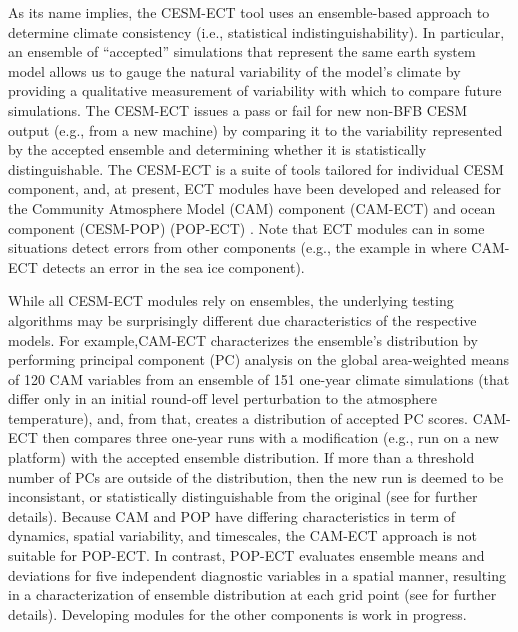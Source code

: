 As its name implies, the CESM-ECT tool uses an ensemble-based approach
to determine climate consistency (i.e., statistical
indistinguishability).  In particular, an ensemble of ``accepted''
simulations that represent the same earth system model allows us to
gauge the natural variability of the model’s climate by providing a
qualitative measurement of variability with which to compare future
simulations. The CESM-ECT issues a pass or fail for new non-BFB CESM
output (e.g., from a new machine) by comparing it to the variability
represented by the accepted ensemble and determining whether it is
statistically distinguishable.  The CESM-ECT is a suite of tools
tailored for individual CESM component, and, at present, ECT modules
have been developed and released for the Community Atmosphere Model
(CAM) component (CAM-ECT) \cite{baker2015} and ocean component
(CESM-POP) (POP-ECT) \cite{baker2016}. Note that ECT modules can in
some situations detect errors from other components (e.g., the example
in \cite{baker2015} where CAM-ECT detects an error in the sea ice
component). 

While all CESM-ECT modules rely on ensembles, the underlying testing
algorithms may be surprisingly different due characteristics of the
respective models.  For example,CAM-ECT characterizes the ensemble's
distribution by performing principal component (PC) analysis on the
global area-weighted means of 120 CAM variables from an ensemble of
151 one-year climate simulations (that differ only in an initial
round-off level perturbation to the atmosphere temperature), and, from
that, creates a distribution of accepted PC scores.  CAM-ECT then
compares three one-year runs with a modification (e.g., run on a new
platform) with the accepted ensemble distribution.  If more than a
threshold number of PCs are outside of the distribution, then the new
run is deemed to be inconsistant, or statistically distinguishable
from the original (see \cite{baker2015} for further details).  Because
CAM and POP have differing characteristics in term of dynamics,
spatial variability, and timescales, the CAM-ECT approach is not
suitable for POP-ECT.  In contrast, POP-ECT evaluates ensemble means
and deviations for five independent diagnostic variables in a spatial
manner, resulting in a characterization of ensemble distribution at
each grid point (see \cite{baker2016} for further details).
Developing modules for the other components is work in
progress.

